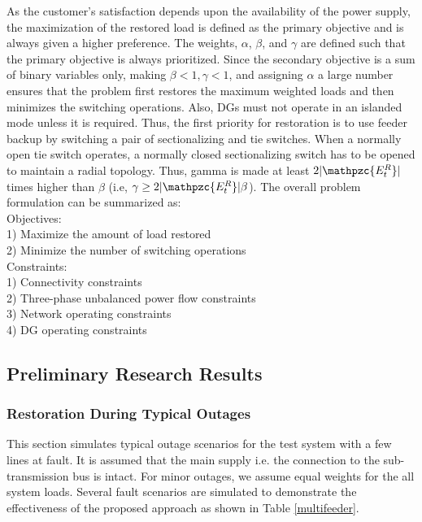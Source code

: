 \documentclass[12pt]{article}
\begin{document}
As the customer's satisfaction depends upon the availability of the power supply, the  maximization of the restored load is defined as the primary objective and is always given a higher preference. %
The weights, $\alpha$, $\beta$, and $\gamma$ are defined such that the primary objective is always prioritized. Since the secondary objective is a sum of binary variables only, making $\beta <1, \gamma <1$, and assigning $\alpha$ a large number ensures that the problem first restores the maximum weighted loads and then minimizes the switching operations. Also, DGs must not operate in an islanded mode unless it is required. %
Thus, the first priority for restoration is to use feeder backup by switching a pair of sectionalizing and tie switches. When a normally open tie switch operates, a normally closed sectionalizing switch has to be opened to maintain a radial topology. Thus, gamma is made at least $2|\mathpzc{E_t^R}|$ times higher than $\beta$ (i.e, $\gamma \geq 2|\mathpzc{E_t^R}|\beta$).
The overall problem formulation can be summarized as:\\
\newcommand\tab[1][0.5cm]{\hspace*{#1}}
	\tab Objectives:\\
	\tab \tab1) Maximize the amount of load restored\\
	\tab \tab2) Minimize the number of switching operations\\
	\tab Constraints:\\
	\tab \tab1) Connectivity constraints\\
	\tab \tab2) Three-phase unbalanced power flow constraints\\
	\tab \tab3) Network operating constraints\\
	\tab \tab4) DG operating constraints
	
\subsection{Preliminary Research Results}

\subsubsection{Restoration During Typical Outages}
This section simulates typical outage scenarios for the test system with a few lines at fault. It is assumed that the main supply i.e. the connection to the sub-transmission bus is intact. For minor outages, we assume equal weights for the all system loads. Several fault scenarios are simulated to demonstrate the effectiveness of the proposed approach as shown in Table \ref{multifeeder}.
\end{document}
